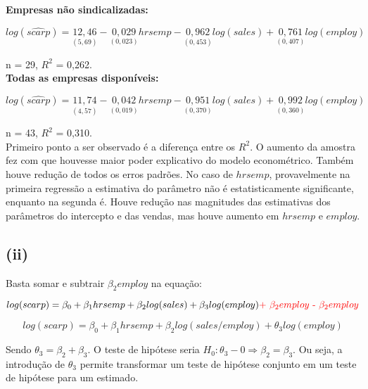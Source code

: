 \documentclass[hidelinks,11pt]{book}
\theoremstyle{definition}
\begin{document}
\textbf{Empresas não sindicalizadas:}

\begin{displaymath}
	log(\hat{scarp}) = \underset{(5,69)}{12,46} -  \underset{(0,023)}{0,029} hrsemp -  \underset{(0,453)}{0,962} log(sales) +  \underset{(0,407)}{0,761} log(employ)
\end{displaymath}

n = 29, $R^2$ = 0,262.\\

\textbf{Todas as empresas disponíveis:}

\begin{displaymath}
	log(\hat{scarp}) = \underset{(4,57)}{11,74} -  \underset{(0,019)}{0,042} hrsemp -  \underset{(0,370)}{0,951} log(sales) +  \underset{(0,360)}{0,992} log(employ)
\end{displaymath}

n = 43, $R^2$ = 0,310.\\

Primeiro ponto a ser observado é a diferença entre os $R^2$. O aumento da amostra fez com que houvesse maior poder explicativo do modelo econométrico. Também houve redução de todos os erros padrões. No caso de $hrsemp$, provavelmente na primeira regressão a estimativa do parâmetro não é estatisticamente significante, enquanto na segunda é. Houve redução nas magnitudes das estimativas dos parâmetros do intercepto e das vendas, mas houve aumento em $hrsemp$ e $employ$.

\subsection*{(ii)}

Basta somar e subtrair $\beta_2 employ$ na equação:

\begin{displaymath}
	log(scarp) = \beta_0  + \beta_1 hrsemp +  \beta_2 log(sales) +  \beta_3 log(employ)   \textrm{\textcolor{red}{ + $\beta_2 employ$ - $\beta_2 employ$}}
\end{displaymath}

\begin{displaymath}
	log(scarp) = \beta_0  + \beta_1 hrsemp +  \beta_2 log(sales/employ) +  \theta_3 log(employ)   
\end{displaymath}

Sendo $\theta_3 = \beta_2 + \beta_3$. O teste de hipótese seria $H_0: \theta_3 - 0 \Rightarrow \beta_2 = \beta_3$. Ou seja, a introdução de $\theta_3$ permite transformar um teste de hipótese conjunto em um teste de hipótese para um estimado.
\end{document}
